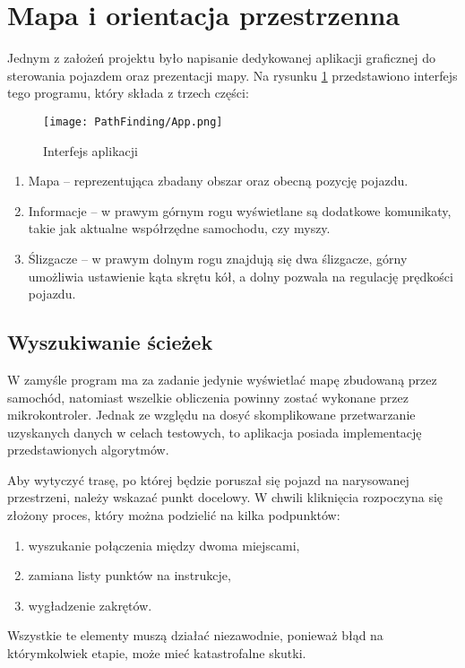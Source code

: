 \section{Mapa i orientacja przestrzenna}
    Jednym z założeń projektu było napisanie dedykowanej aplikacji graficznej do sterowania pojazdem oraz prezentacji mapy.
    Na rysunku \ref{fig:app} przedstawiono interfejs tego programu, który składa z trzech części:
    \begin{figure}[!ht]
        \centering
        \texttt{[image: PathFinding/App.png]}
        \caption{Interfejs aplikacji}
        \label{fig:app}
    \end{figure}
    \begin{enumerate}
        \item Mapa -- reprezentująca zbadany obszar oraz obecną pozycję pojazdu.
        \item Informacje -- w prawym górnym rogu wyświetlane są dodatkowe komunikaty, takie jak aktualne współrzędne samochodu, czy myszy.
        \item Ślizgacze -- w prawym dolnym rogu znajdują się dwa ślizgacze, górny umożliwia ustawienie kąta skrętu kół, a dolny pozwala na regulację prędkości pojazdu.
    \end{enumerate}

    \subsection{Wyszukiwanie ścieżek}
        W zamyśle program ma za zadanie jedynie wyświetlać mapę zbudowaną przez samochód, natomiast wszelkie obliczenia powinny zostać wykonane przez mikrokontroler.
        Jednak ze względu na dosyć skomplikowane przetwarzanie uzyskanych danych w celach testowych, to aplikacja posiada implementację przedstawionych algorytmów.

        Aby wytyczyć trasę, po której będzie poruszał się pojazd na narysowanej przestrzeni, należy wskazać punkt docelowy.
        W chwili kliknięcia rozpoczyna się złożony proces, który można podzielić na kilka podpunktów:
        \begin{enumerate}
            \item wyszukanie połączenia między dwoma miejscami,
            \item zamiana listy punktów na instrukcje,
            \item wygładzenie zakrętów.
        \end{enumerate}
        Wszystkie te elementy muszą działać niezawodnie, ponieważ błąd na którymkolwiek etapie, może mieć katastrofalne skutki.

